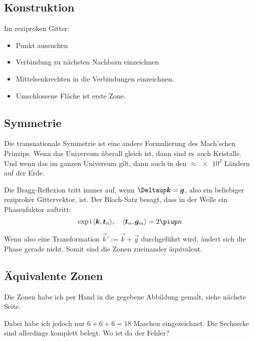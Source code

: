 \subsection{Konstruktion}

Im reziproken Gitter:

\begin{itemize}
	\item Punkt aussuchen
	\item Verbindung zu nächsten Nachbarn einzeichnen
	\item Mittelsenkrechten in die Verbindungen einzeichnen.
	\item Umschlossene Fläche ist erste Zone.
\end{itemize}

\subsection{Symmetrie}

\begin{small}
Die transnationale Symmetrie ist eine andere Formulierung des Mach'schen
Prinzips. Wenn das Universum überall gleich ist, dann sind es auch Kristalle.
Und wenn das im ganzen Universum gilt, dann auch in den $\approx \num{e2}$
Ländern auf der Erde.
\end{small}

Die Bragg-Reflexion tritt immer auf, wenn $\Deltaup \vec k = \vec g$, also ein
beliebiger reziproker Gittervektor, ist. Der Bloch-Satz besagt, dass in der
Welle ein Phasenfaktor auftritt: \cite[Vorlesung 16, Folie
7]{meschede/physik441}
\[
	\exp{\ii \inner{\vec k}{\vec t_n}}
	\eqnsep
	\inner{\vec t_n}{\vec g_m} = 2\piup n
\]

Wenn also eine Transformation $\vec k' := \vec k + \vec g$ durchgeführt wird,
ändert sich die Phase gerade nicht. Somit sind die Zonen zueinander äquivalent.

\subsection{Äquivalente Zonen}

Die Zonen habe ich per Hand in die gegebene Abbildung gemalt, siehe nächste
Seite.

Dabei habe ich jedoch nur $6+6+6=18$ Maschen eingezeichnet. Die Sechsecke sind
allerdings komplett belegt. Wo ist da der Fehler?




\IfFileExists{\bibliographyfile}{
	
}{}



